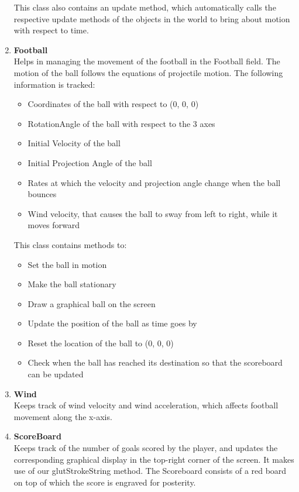 \documentclass[12pt]{article} %
\begin{document}
\begin{enumerate}
This class also contains an update method, which automatically calls the respective update methods of the objects in the world to bring about motion with respect to time.

\item{\textbf{Football}}\\
Helps in managing the movement of the football in the Football field. The motion of the ball follows the equations of projectile motion. The following information is tracked:
\begin{itemize}
\item{Coordinates of the ball with respect to (0, 0, 0)}
\item{RotationAngle of the ball with respect to the 3 axes}
\item{Initial Velocity of the ball}
\item{Initial Projection Angle of the ball}
\item{Rates at which the velocity and projection angle change when the ball bounces}
\item{Wind velocity, that causes the ball to sway from left to right, while it moves forward}
\end{itemize}

This class contains methods to:
\begin{itemize}
\item{Set the ball in motion}
\item{Make the ball stationary}
\item{Draw a graphical ball on the screen}
\item{Update the position of the ball as time goes by}
\item{Reset the location of the ball to (0, 0, 0)}
\item{Check when the ball has reached its destination so that the scoreboard can be updated}
\end{itemize}

\item{\textbf{Wind}}\\
Keeps track of wind velocity and wind acceleration, which affects football movement along the x-axis.

\item{\textbf{ScoreBoard}}\\
Keeps track of the number of goals scored by the player, and updates the corresponding graphical display in the top-right corner of the screen. It makes use of our glutStrokeString method. The Scoreboard consists of a red board on top of which the score is engraved for posterity.


\end{enumerate}
\end{document}
